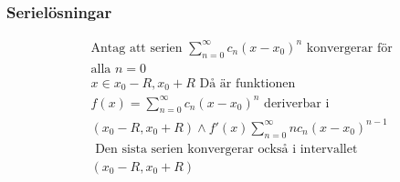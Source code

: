 \begin{multicols}{2}
\subsubsection{Serielösningar} %
\begin{align*}
  &\text{Antag att serien } \displaystyle\sum_{n=0}^{\infty} c_n{(x-x_0)}^n \text{ konvergerar för} \\
  &\text{alla } n=0 \\
  &x\in{x_0-R, x_0+R} \text{ Då är funktionen } \\
  &f(x) = \displaystyle\sum_{n=0}^{\infty} c_n{(x-x_0)}^n 
  \text{ deriverbar i }  \\
  &(x_0-R, x_0+R) \land  f'(x) \displaystyle\sum_{n=0}^{\infty} nc_n{(x-x_0)}^{n-1} \\
  &\text{ Den sista serien konvergerar också i intervallet } \\
  &(x_0-R, x_0+R) \\
\end{align*}
\end{multicols}
\raggedcolumns

